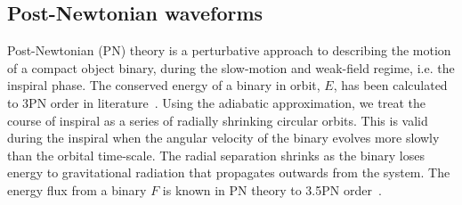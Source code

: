 \subsection{Post-Newtonian waveforms}\label{s2:PNwaveforms}

Post-Newtonian (PN) theory is a perturbative approach to describing the
motion of a compact object binary, during the slow-motion and weak-field 
regime, i.e. the inspiral phase. The conserved energy of a binary in orbit,
$E$, has been calculated to 3PN order in literature~\cite{Jaranowski:1997ky,
Jaranowski:1999ye,Jaranowski:1999qd,Damour:2001bu,Blanchet:2003gy,
Damour:2000ni,Blanchet:2002mb}.
Using the adiabatic approximation, we treat the course of inspiral as a series
of radially shrinking circular orbits. This is valid during the inspiral when
the angular velocity of the binary evolves more slowly than the orbital 
time-scale. The radial separation shrinks as the binary loses energy to 
gravitational radiation that propagates outwards from the system. 
The energy flux from a binary $F$ is known in PN theory to 3.5PN 
order~\cite{FluxandE3-5PN,Blanchet:2004ek,Blanchet:2005tk,Blanchet:2004bb}.
